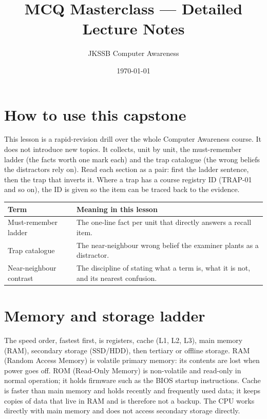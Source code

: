 \documentclass[11pt]{article}
\title{MCQ Masterclass --- Detailed Lecture Notes}
\author{JKSSB Computer Awareness}
\date{\today}
\begin{document}
\maketitle

\section{How to use this capstone}

This lesson is a rapid-revision drill over the whole Computer Awareness
course. It does not introduce new topics. It collects, unit by unit, the
must-remember ladder (the facts worth one mark each) and the trap catalogue
(the wrong beliefs the distractors rely on). Read each section as a pair:
first the ladder sentence, then the trap that inverts it. Where a trap has a
course registry ID (TRAP-01 and so on), the ID is given so the item can be
traced back to the evidence.

\begin{center}
\begin{tabular}{p{}p{}}
\toprule
\textbf{Term} & \textbf{Meaning in this lesson} \\
\midrule
Must-remember ladder & The one-line fact per unit that directly answers a recall item. \\
Trap catalogue & The near-neighbour wrong belief the examiner plants as a distractor. \\
Near-neighbour contrast & The discipline of stating what a term is, what it is not, and its nearest confusion. \\
\bottomrule
\end{tabular}
\end{center}

\section{Memory and storage ladder}

The speed order, fastest first, is registers, cache (L1, L2, L3), main memory
(RAM), secondary storage (SSD/HDD), then tertiary or offline storage. RAM
(Random Access Memory) is volatile primary memory: its contents are lost when
power goes off. ROM (Read-Only Memory) is non-volatile and read-only in
normal operation; it holds firmware such as the BIOS startup instructions.
Cache is faster than main memory and holds recently and frequently used data;
it keeps copies of data that live in RAM and is therefore not a backup. The
CPU works directly with main memory and does not access secondary storage
directly.
\end{document}
